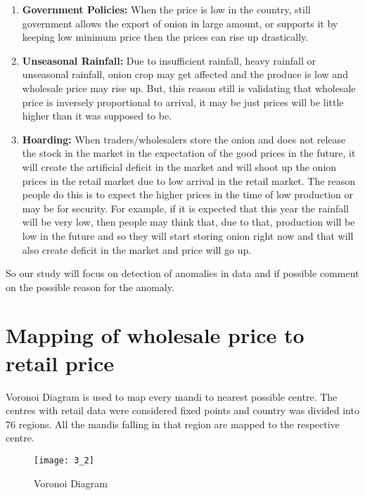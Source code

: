 \begin{enumerate}

\item \textbf{Government Policies:} When the price is low in the country, still government allows the export of onion in large amount, or supports it by keeping low minimum price then the prices can rise up drastically.

\item \textbf{Unseasonal Rainfall:} Due to insufficient rainfall, heavy rainfall or unseasonal rainfall, onion crop may get affected and the produce is low and wholesale price may rise up. But, this reason still is validating that wholesale price is inversely proportional to arrival, it may be just prices will be little higher than it was supposed to be.

\item \textbf{Hoarding:} When traders/wholesalers store the onion and does not release the stock in the market in the expectation of the good prices in the future, it will create the artificial deficit in the market and will shoot up the onion prices in the retail market due to low arrival in the retail market. The reason people do this is to expect the higher prices in the time of low production or may be for security. For example, if it is expected that this year the rainfall will be very low, then people may think that, due to that, production will be low in the future and so they will start storing onion right now and that will also create deficit in the market and price will go up. 

\end{enumerate}

So our study will focus on detection of anomalies in data and if possible comment on the possible reason for the anomaly.

\section{Mapping of wholesale price to retail price}

Voronoi Diagram is used to map every mandi to nearest possible centre. The centres with retail data were considered fixed points and country was divided into 76 regions. All the mandis falling in that region are mapped to the respective centre.


\begin{figure}[here]
\begin{center}	
\texttt{[image: 3\_2]} 
\caption{Voronoi Diagram}
\label{fig:Voronoi Diagram}
\end{center}
\end{figure}


